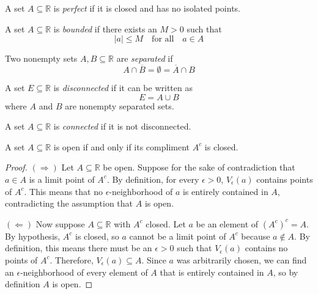 \par\vspace{1 cm}
\begin{definition*} A set $A\subseteq\mathbb{R}$ is \textit{perfect} if it is closed and has no isolated points.
\end{definition*}
\par\vspace{1 cm}
\begin{definition*} A set $A\subseteq\mathbb{R}$ is \textit{bounded} if there exists an $M>0$ such that
\[
|a| \leq M\quad\mbox{for all}\quad a\in A
\]
\end{definition*}
\par\vspace{1 cm}
\begin{definition*} Two nonempty sets $A,B\subseteq\mathbb{R}$ are \textit{separated} if
\[
A\cap\overline{B} = \emptyset = \overline{A}\cap B
\]
\end{definition*}
\par\vspace{1 cm}
\begin{definition*} A set $E\subseteq\mathbb{R}$ is \textit{disconnected} if it can be written as 
\[
E=A\cup B
\]
where $A$ and $B$ are nonempty separated sets.
\end{definition*}
\par\vspace{1 cm}
\begin{definition*} A set $A\subseteq\mathbb{R}$ is \textit{connected} if it is not disconnected.
\end{definition*}
\par\vspace{1 cm}
\begin{theorem*} A set $A\subseteq\mathbb{R}$ is open if and only if its compliment $A^c$ is closed.
\end{theorem*}
\begin{proof}
$(\Rightarrow)$ Let $A\subseteq\mathbb{R}$ be open.  Suppose for the sake of contradiction that $a\in A$ is a limit point of $A^c$. By definition, for every $\epsilon>0$, $V_{\epsilon}(a)$ contains points of $A^c$.  This means that no $\epsilon$-neighborhood of $a$ is entirely contained in $A$, contradicting the assumption that $A$ is open.
\par\vspace{0.3 cm}\noindent
$(\Leftarrow)$ Now suppose $A\subseteq\mathbb{R}$ with $A^c$ closed.  Let $a$ be an element of $(A^c)^c=A$.  By hypothesis, $A^c$ is closed, so $a$ cannot be a limit point of $A^c$ because $a\notin A$.  By definition, this means there must be an $\epsilon>0$ such that $V_{\epsilon}(a)$ contains no points of $A^c$.  Therefore, $V_{\epsilon}(a)\subseteq A$.  Since $a$ was arbitrarily chosen, we can find an $\epsilon$-neighborhood of every element of $A$ that is entirely contained in $A$, so by definition $A$ is open.  
\end{proof}
